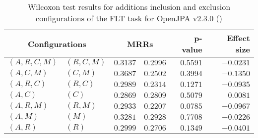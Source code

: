 
\begin{table}
\begin{spacing}{1.2}
\centering
\caption{Wilcoxon test results for additions inclusion and exclusion configurations of the FLT task for OpenJPA v2.3.0 (\ctwo)}
\label{table:versus-wilcox-openjpa-flt-additions}
\begin{tabular}{ll|rr|rr}
\toprule
      \multicolumn{2}{c|}{Configurations} &                \multicolumn{2}{c|}{MRRs} &        p-value & Effect size \\
\midrule
 $(A,R,C,M)$ &  $(R,C,M)$ &  $\bm{0.3137}$ &  $0.2996$ & $0.5591$ &   $-0.0231$ \\
   $(A,C,M)$ &    $(C,M)$ &  $\bm{0.3687}$ &  $0.2502$ & $0.3994$ &   $-0.1350$ \\
   $(A,R,C)$ &    $(R,C)$ &  $\bm{0.2989}$ &  $0.2314$ & $0.1271$ &   $-0.0935$ \\
     $(A,C)$ &      $(C)$ &  $\bm{0.2869}$ &  $0.2809$ & $0.5079$ &    $0.0081$ \\
   $(A,R,M)$ &    $(R,M)$ &  $\bm{0.2933}$ &  $0.2207$ & $0.0785$ &   $-0.0967$ \\
     $(A,M)$ &      $(M)$ &  $\bm{0.3281}$ &  $0.2928$ & $0.7708$ &   $-0.0226$ \\
     $(A,R)$ &      $(R)$ &  $\bm{0.2999}$ &  $0.2706$ & $0.1349$ &   $-0.0401$ \\
\bottomrule
\end{tabular}

\end{spacing}
\end{table}

